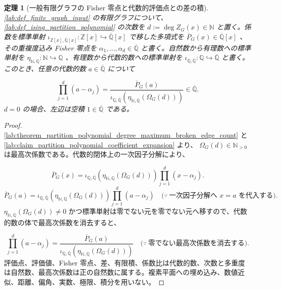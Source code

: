\documentclass[11pt,a4paper]{article}
\newtheorem{theorem}[definition]{定理}
\theoremstyle{remark}
\begin{document}
\begin{theorem}[一般有限グラフの Fisher 零点と代数的評価点との差の積]\label{lab:theorem_fisher_zero_algebraic_shifted_product_coefficient_ratio}
\cref{lab:def_finite_graph_input}
 の有限グラフについて、
\cref{lab:def_ising_partition_polynomial}
 の次数を
$d:=\deg Z_G(x)\in\mathbb N$
 と置く。係数を標準単射
$\iota_{\mathbb Z[x],\overline{\mathbb Q}[x]}:\mathbb Z[x]\hookrightarrow\overline{\mathbb Q}[x]$
 で移した多項式を
$\overline P_G(x)\in\overline{\mathbb Q}[x]$
、その重複度込み Fisher 零点を
$\alpha_1,\ldots,\alpha_d\in\overline{\mathbb Q}$
 と書く。自然数から有理数への標準単射を
$\eta_{\mathbb N,\mathbb Q}:\mathbb N\hookrightarrow\mathbb Q$
、有理数から代数的数への標準単射を
$\iota_{\mathbb Q,\overline{\mathbb Q}}:\mathbb Q\hookrightarrow\overline{\mathbb Q}$
 と書く。このとき、任意の代数的数
$a\in\overline{\mathbb Q}$
 について

\[\prod_{j=1}^{d}(a-\alpha_j)
=
\frac{
  \overline P_G(a)
}{
  \iota_{\mathbb Q,\overline{\mathbb Q}}\!\left(
    \eta_{\mathbb N,\mathbb Q}(\Omega_G(d))
  \right)
}
\in\overline{\mathbb Q}.\]
$d=0$
 の場合、左辺は空積
$1\in\overline{\mathbb Q}$
 である。

\end{theorem}
\begin{proof}
\cref{lab:theorem_partition_polynomial_degree_maximum_broken_edge_count}
 と
\cref{lab:claim_partition_polynomial_coefficient_expansion}
 より、
$\Omega_G(d)\in\mathbb N_{>0}$
 は最高次係数である。代数的閉体上の一次因子分解により、

\[\overline P_G(x)
=
\iota_{\mathbb Q,\overline{\mathbb Q}}\!\left(
  \eta_{\mathbb N,\mathbb Q}(\Omega_G(d))
\right)
\prod_{j=1}^{d}(x-\alpha_j).\]
\[\overline P_G(a)
=
\iota_{\mathbb Q,\overline{\mathbb Q}}\!\left(
  \eta_{\mathbb N,\mathbb Q}(\Omega_G(d))
\right)
\prod_{j=1}^{d}(a-\alpha_j)
\quad\bigl(\because\ \text{一次因子分解へ }x=a\text{ を代入する}\bigr).\]
$\eta_{\mathbb N,\mathbb Q}(\Omega_G(d))\ne0$
 かつ標準単射は零でない元を零でない元へ移すので、代数的数の体で最高次係数を消去すると、

\[\prod_{j=1}^{d}(a-\alpha_j)
=
\frac{
  \overline P_G(a)
}{
  \iota_{\mathbb Q,\overline{\mathbb Q}}\!\left(
    \eta_{\mathbb N,\mathbb Q}(\Omega_G(d))
  \right)
}
\quad\bigl(\because\ \text{零でない最高次係数を消去する}\bigr).\]
評価点、評価値、Fisher 零点、差、有限積、係数比は代数的数、次数と多重度は自然数、最高次係数は正の自然数に属する。複素平面への埋め込み、数値近似、距離、偏角、実数、極限、積分を用いない。

\end{proof}
\end{document}

